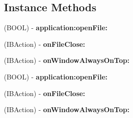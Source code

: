 \subsection*{Instance Methods}
\begin{DoxyCompactItemize}
\item 
\mbox{\label{interfaceAppController_a49b06782913dcfaab565cb97392e3e62}} 
(B\+O\+OL) -\/ {\bfseries application\+:open\+File\+:}
\item 
\mbox{\label{interfaceAppController_a7e5e9ad68c180928f15794110c60cd01}} 
(I\+B\+Action) -\/ {\bfseries on\+File\+Close\+:}
\item 
\mbox{\label{interfaceAppController_a30ea7aff51fca28aa492f08d786e5592}} 
(I\+B\+Action) -\/ {\bfseries on\+Window\+Always\+On\+Top\+:}
\item 
\mbox{\label{interfaceAppController_a49b06782913dcfaab565cb97392e3e62}} 
(B\+O\+OL) -\/ {\bfseries application\+:open\+File\+:}
\item 
\mbox{\label{interfaceAppController_a7e5e9ad68c180928f15794110c60cd01}} 
(I\+B\+Action) -\/ {\bfseries on\+File\+Close\+:}
\item 
\mbox{\label{interfaceAppController_a30ea7aff51fca28aa492f08d786e5592}} 
(I\+B\+Action) -\/ {\bfseries on\+Window\+Always\+On\+Top\+:}
\end{DoxyCompactItemize}
